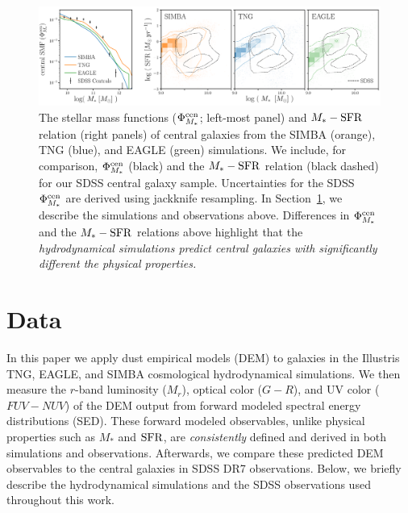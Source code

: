 \begin{figure}
\begin{center}
    \includegraphics[width=\textwidth]{figs/smf_m_sfr.pdf}
    \caption{\label{fig:smf_msfr}
    The stellar mass functions ($\Phi^{\rm cen}_{M_*}$; left-most panel) and
    $M_*-{\rm SFR}$ relation (right panels) of central galaxies from the SIMBA
    (orange), TNG (blue), and EAGLE (green) simulations. We include, for
    comparison, $\Phi^{\rm cen}_{M_*}$ (black) and the $M_*-{\rm SFR}$ relation
    (black dashed) for our SDSS central galaxy sample. Uncertainties for 
    the SDSS $\Phi^{\rm cen}_{M_*}$ are derived using jackknife resampling. 
    In Section~\ref{sec:sims}, we describe the simulations and observations 
    above. Differences in $\Phi^{\rm cen}_{M_*}$ and the $M_*-{\rm SFR}$ relations 
    above highlight that the \emph{hydrodynamical simulations predict central 
    galaxies with significantly different the physical properties.}
    }
\end{center}
\end{figure}

\section{Data}\label{sec:sims}
In this paper we apply dust empirical models (DEM) to galaxies in the Illustris TNG,
EAGLE, and SIMBA cosmological hydrodynamical simulations. We then measure the
$r$-band luminosity ($M_r$), optical color ($G-R$), and UV color ($FUV-NUV$) of
the DEM output from forward modeled spectral energy distributions (SED). These 
forward modeled observables, unlike physical properties such as $M_*$ and
${\rm SFR}$, are \emph{consistently} defined and derived in both simulations and
observations. Afterwards, we compare these predicted DEM observables to the 
central galaxies in SDSS DR7 observations. Below, we briefly describe the 
hydrodynamical simulations and the SDSS observations used throughout this
work.

